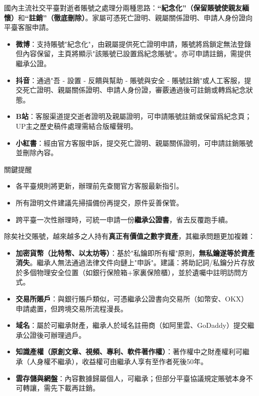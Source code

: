 
國內主流社交平臺對逝者賬號之處理分兩種思路：\textbf{“紀念化”（保留賬號使親友緬懷）}和\textbf{“註銷”（徹底刪除）}。家屬可憑死亡證明、親屬關係證明、申請人身份證向平臺客服申請。

\begin{itemize}
  \item \textbf{微博}：支持賬號"紀念化"，由親屬提供死亡證明申請，賬號將爲鎖定無法登錄但內容保留，主頁將顯示"該賬號已設置爲紀念賬號"。亦可申請註銷，需提供繼承公證。
  \item \textbf{抖音}：通過"吾 - 設置 - 反饋與幫助 - 賬號與安全 - 賬號註銷"或人工客服，提交死亡證明、親屬關係證明、申請人身份證，審覈通過後可註銷或轉爲紀念狀態。
  \item \textbf{B站}：客服渠道提交逝者證明及親屬證明，可申請賬號註銷或保留爲紀念頁；UP主之歷史稿件處理需結合版權聲明。
  \item \textbf{小紅書}：經由官方客服申訴，提交死亡證明、親屬關係證明，可申請註銷賬號並刪除內容。
\end{itemize}

\begin{tcbinfo}{關鍵提醒}
\begin{itemize}
  \item 各平臺規則將更新，辦理前先查閱官方客服最新指引。
  \item 所有證明文件建議先掃描備份再提交，原件妥善保管。
  \item 跨平臺一次性辦理時，可統一申請一份\textbf{繼承公證書}，省去反覆跑手續。
\end{itemize}

\end{tcbinfo}


除矣社交賬號，越來越多之人持有\textbf{真正有價值之數字資產}，其繼承問題更加複雜：

\begin{itemize}
  \item \textbf{加密貨幣（比特幣、以太坊等）}：基於"私鑰即所有權"原則，\textbf{無私鑰遂等於資產消失}。繼承人無法通過法律文件向鏈上"申訴"。建議：將助記詞/私鑰分片存放於多個物理安全位置（如銀行保險箱+家裏保險櫃），並於遺囑中註明訪問方式。
  \item \textbf{交易所賬戶}：與銀行賬戶類似，可憑繼承公證書向交易所（如幣安、OKX）申請處置，但跨境交易所流程漫長。
  \item \textbf{域名}：屬於可繼承財產，繼承人於域名註冊商（如阿里雲、GoDaddy）提交繼承公證後可辦理過戶。
  \item \textbf{知識產權（原創文章、視頻、專利、軟件著作權）}：著作權中之財產權利可繼承（人身權不繼承），收益權可由繼承人享有至作者死後50年。
  \item \textbf{雲存儲與網盤}：內容數據歸屬個人，可繼承；但部分平臺協議規定賬號本身不可轉讓，需先下載再註銷。
\end{itemize}

